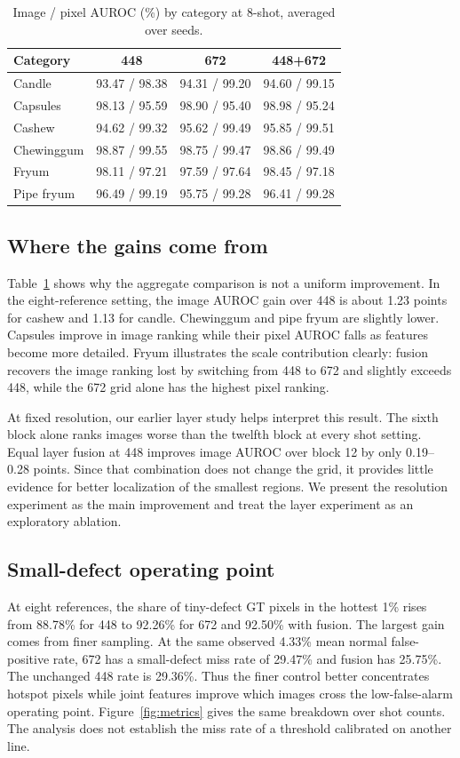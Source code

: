 \documentclass[10pt,twocolumn,letterpaper]{article}
\begin{document}
\begin{table}[t]
\centering
\caption{Image / pixel AUROC (\%) by category at 8-shot, averaged over seeds.}
\label{tab:category}
\setlength{\tabcolsep}{3pt}
\begin{tabular}{lccc}
\toprule
Category & 448 & 672 & 448+672\\
\midrule
Candle & 93.47 / 98.38 & 94.31 / 99.20 & 94.60 / 99.15\\
Capsules & 98.13 / 95.59 & 98.90 / 95.40 & 98.98 / 95.24\\
Cashew & 94.62 / 99.32 & 95.62 / 99.49 & 95.85 / 99.51\\
Chewinggum & 98.87 / 99.55 & 98.75 / 99.47 & 98.86 / 99.49\\
Fryum & 98.11 / 97.21 & 97.59 / 97.64 & 98.45 / 97.18\\
Pipe fryum & 96.49 / 99.19 & 95.75 / 99.28 & 96.41 / 99.28\\
\bottomrule
\end{tabular}
\end{table}

\subsection{Where the gains come from}
Table~\ref{tab:category} shows why the aggregate comparison is not a uniform improvement. In the eight-reference setting, the image AUROC gain over 448 is about 1.23 points for cashew and 1.13 for candle. Chewinggum and pipe fryum are slightly lower. Capsules improve in image ranking while their pixel AUROC falls as features become more detailed. Fryum illustrates the scale contribution clearly: fusion recovers the image ranking lost by switching from 448 to 672 and slightly exceeds 448, while the 672 grid alone has the highest pixel ranking.

At fixed resolution, our earlier layer study helps interpret this result. The sixth block alone ranks images worse than the twelfth block at every shot setting. Equal layer fusion at 448 improves image AUROC over block 12 by only 0.19--0.28 points. Since that combination does not change the grid, it provides little evidence for better localization of the smallest regions. We present the resolution experiment as the main improvement and treat the layer experiment as an exploratory ablation.

\subsection{Small-defect operating point}
At eight references, the share of tiny-defect GT pixels in the hottest 1\% rises from 88.78\% for 448 to 92.26\% for 672 and 92.50\% with fusion. The largest gain comes from finer sampling. At the same observed 4.33\% mean normal false-positive rate, 672 has a small-defect miss rate of 29.47\% and fusion has 25.75\%. The unchanged 448 rate is 29.36\%. Thus the finer control better concentrates hotspot pixels while joint features improve which images cross the low-false-alarm operating point. Figure~\ref{fig:metrics} gives the same breakdown over shot counts. The analysis does not establish the miss rate of a threshold calibrated on another line.
\end{document}
